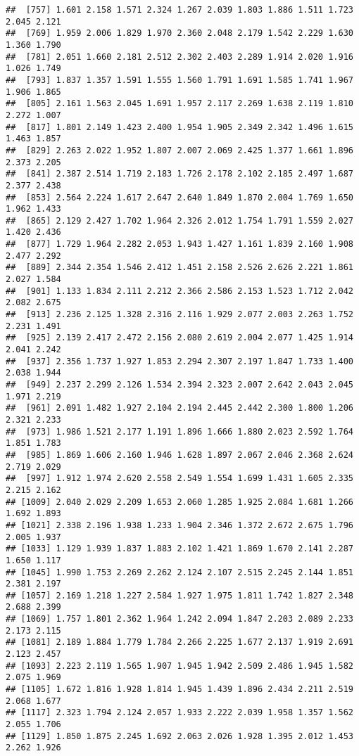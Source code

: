 \documentclass[
]{article}
\begin{document}
\begin{verbatim}
##  [757] 1.601 2.158 1.571 2.324 1.267 2.039 1.803 1.886 1.511 1.723 2.045 2.121
##  [769] 1.959 2.006 1.829 1.970 2.360 2.048 2.179 1.542 2.229 1.630 1.360 1.790
##  [781] 2.051 1.660 2.181 2.512 2.302 2.403 2.289 1.914 2.020 1.916 1.026 1.749
##  [793] 1.837 1.357 1.591 1.555 1.560 1.791 1.691 1.585 1.741 1.967 1.906 1.865
##  [805] 2.161 1.563 2.045 1.691 1.957 2.117 2.269 1.638 2.119 1.810 2.272 1.007
##  [817] 1.801 2.149 1.423 2.400 1.954 1.905 2.349 2.342 1.496 1.615 1.463 1.857
##  [829] 2.263 2.022 1.952 1.807 2.007 2.069 2.425 1.377 1.661 1.896 2.373 2.205
##  [841] 2.387 2.514 1.719 2.183 1.726 2.178 2.102 2.185 2.497 1.687 2.377 2.438
##  [853] 2.564 2.224 1.617 2.647 2.640 1.849 1.870 2.004 1.769 1.650 1.962 1.433
##  [865] 2.129 2.427 1.702 1.964 2.326 2.012 1.754 1.791 1.559 2.027 1.420 2.436
##  [877] 1.729 1.964 2.282 2.053 1.943 1.427 1.161 1.839 2.160 1.908 2.477 2.292
##  [889] 2.344 2.354 1.546 2.412 1.451 2.158 2.526 2.626 2.221 1.861 2.027 1.584
##  [901] 1.133 1.834 2.111 2.212 2.366 2.586 2.153 1.523 1.712 2.042 2.082 2.675
##  [913] 2.236 2.125 1.328 2.316 2.116 1.929 2.077 2.003 2.263 1.752 2.231 1.491
##  [925] 2.139 2.417 2.472 2.156 2.080 2.619 2.004 2.077 1.425 1.914 2.041 2.242
##  [937] 2.356 1.737 1.927 1.853 2.294 2.307 2.197 1.847 1.733 1.400 2.038 1.944
##  [949] 2.237 2.299 2.126 1.534 2.394 2.323 2.007 2.642 2.043 2.045 1.971 2.219
##  [961] 2.091 1.482 1.927 2.104 2.194 2.445 2.442 2.300 1.800 1.206 2.321 2.233
##  [973] 1.986 1.521 2.177 1.191 1.896 1.666 1.880 2.023 2.592 1.764 1.851 1.783
##  [985] 1.869 1.606 2.160 1.946 1.628 1.897 2.067 2.046 2.368 2.624 2.719 2.029
##  [997] 1.912 1.974 2.620 2.558 2.549 1.554 1.699 1.431 1.605 2.335 2.215 2.162
## [1009] 2.040 2.029 2.209 1.653 2.060 1.285 1.925 2.084 1.681 1.266 1.692 1.893
## [1021] 2.338 2.196 1.938 1.233 1.904 2.346 1.372 2.672 2.675 1.796 2.005 1.937
## [1033] 1.129 1.939 1.837 1.883 2.102 1.421 1.869 1.670 2.141 2.287 1.650 1.117
## [1045] 1.990 1.753 2.269 2.262 2.124 2.107 2.515 2.245 2.144 1.851 2.381 2.197
## [1057] 2.169 1.218 1.227 2.584 1.927 1.975 1.811 1.742 1.827 2.348 2.688 2.399
## [1069] 1.757 1.801 2.362 1.964 1.242 2.094 1.847 2.203 2.089 2.233 2.173 2.115
## [1081] 2.189 1.884 1.779 1.784 2.266 2.225 1.677 2.137 1.919 2.691 2.123 2.457
## [1093] 2.223 2.119 1.565 1.907 1.945 1.942 2.509 2.486 1.945 1.582 2.075 1.969
## [1105] 1.672 1.816 1.928 1.814 1.945 1.439 1.896 2.434 2.211 2.519 2.068 1.677
## [1117] 2.323 1.794 2.124 2.057 1.933 2.222 2.039 1.958 1.357 1.562 2.055 1.706
## [1129] 1.850 1.875 2.245 1.692 2.063 2.026 1.928 1.395 2.012 1.453 2.262 1.926

\end{verbatim}
\end{document}
